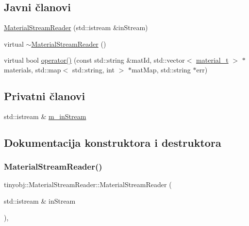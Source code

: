 \subsection*{Javni članovi}
\begin{DoxyCompactItemize}
\item 
\hyperlink{classtinyobj_1_1MaterialStreamReader_a6a6b7167e62d239cb3b002b6aa183773}{Material\+Stream\+Reader} (std\+::istream \&in\+Stream)
\item 
virtual \hyperlink{classtinyobj_1_1MaterialStreamReader_afcafa6030bbf8ea8fdbc6aefb8bebc74}{$\sim$\+Material\+Stream\+Reader} ()
\item 
virtual bool \hyperlink{classtinyobj_1_1MaterialStreamReader_a38db9ec731ad3177efa704d7e60c82fd}{operator()} (const std\+::string \&mat\+Id, std\+::vector$<$ \hyperlink{structtinyobj_1_1material__t}{material\+\_\+t} $>$ $\ast$materials, std\+::map$<$ std\+::string, int $>$ $\ast$mat\+Map, std\+::string $\ast$err)
\end{DoxyCompactItemize}
\subsection*{Privatni članovi}
\begin{DoxyCompactItemize}
\item 
std\+::istream \& \hyperlink{classtinyobj_1_1MaterialStreamReader_a8de39704770b77d36d6cebe09d941435}{m\+\_\+in\+Stream}
\end{DoxyCompactItemize}


\subsection{Dokumentacija konstruktora i destruktora}
\mbox{\label{classtinyobj_1_1MaterialStreamReader_a6a6b7167e62d239cb3b002b6aa183773}} 
\subsubsection{\texorpdfstring{Material\+Stream\+Reader()}{MaterialStreamReader()}}
{\footnotesize\ttfamily tinyobj\+::\+Material\+Stream\+Reader\+::\+Material\+Stream\+Reader (\begin{DoxyParamCaption}\item[{std\+::istream \&}]{in\+Stream }\end{DoxyParamCaption})\hspace{0.3cm}{\ttfamily [inline]}, {\ttfamily [explicit]}}

